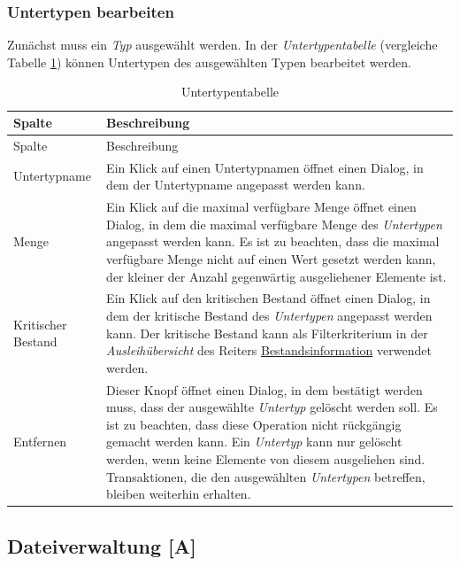\documentclass[
]{article}
\begin{document}
\hypertarget{untertypen-bearbeiten}{%
\subsubsection{Untertypen bearbeiten}\label{untertypen-bearbeiten}}

Zunächst muss ein \emph{Typ} ausgewählt werden. In der \emph{Untertypentabelle} (vergleiche Tabelle \ref{tab:subtype-table}) können Untertypen des ausgewählten Typen bearbeitet werden.

\begin{longtable}[]{@{}
  >{\raggedright\arraybackslash}p{}
  >{\raggedright\arraybackslash}p{}@{}}
\caption{\label{tab:subtype-table} Untertypentabelle}\tabularnewline
\toprule
Spalte & Beschreibung \\
\midrule
\endfirsthead
\toprule
Spalte & Beschreibung \\
\midrule
\endhead
Untertypname & Ein Klick auf einen Untertypnamen öffnet einen Dialog, in dem der Untertypname angepasst werden kann. \\
Menge & Ein Klick auf die maximal verfügbare Menge öffnet einen Dialog, in dem die maximal verfügbare Menge des \emph{Untertypen} angepasst werden kann. Es ist zu beachten, dass die maximal verfügbare Menge nicht auf einen Wert gesetzt werden kann, der kleiner der Anzahl gegenwärtig ausgeliehener Elemente ist. \\
Kritischer Bestand & Ein Klick auf den kritischen Bestand öffnet einen Dialog, in dem der kritische Bestand des \emph{Untertypen} angepasst werden kann. Der kritische Bestand kann als Filterkriterium in der \emph{Ausleihübersicht} des Reiters \protect\hyperlink{reporting}{Bestandsinformation} verwendet werden. \\
Entfernen & Dieser Knopf öffnet einen Dialog, in dem bestätigt werden muss, dass der ausgewählte \emph{Untertyp} gelöscht werden soll. Es ist zu beachten, dass diese Operation nicht rückgängig gemacht werden kann. Ein \emph{Untertyp} kann nur gelöscht werden, wenn keine Elemente von diesem ausgeliehen sind. Transaktionen, die den ausgewählten \emph{Untertypen} betreffen, bleiben weiterhin erhalten. \\
\bottomrule
\end{longtable}

\hypertarget{file-management}{%
\subsection{Dateiverwaltung {[}A{]}}\label{file-management}}
\end{document}
